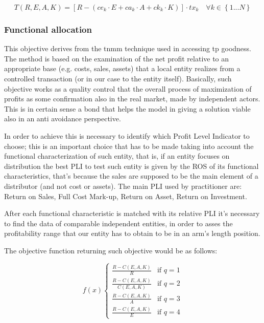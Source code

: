 \begin{doublespace}
\begin{equation}
T(R,E,A,K)= [R-(ce_k\cdot E+ca_k\cdot A+ck_k\cdot K)]\cdot tx_k \quad \forall k \in \left\{1...N\right\}
\end{equation}

\subsubsection{Functional allocation}
This objective derives from the \gls{tnmm} technique used in accessing \gls{tp} goodness. The method is based on the examination of the net profit relative to an appropriate base (e.g. costs, sales, assets) that a local entity realizes from a controlled transaction (or in our case to the entity itself). Basically, such objective works as a quality control that the overall process of maximization of profits as some confirmation also in the real market, made by independent actors. This is in certain sense a bond that helps the model in giving a solution viable also in an anti avoidance perspective.

In order to achieve this is necessary to identify which Profit Level Indicator to choose; this is an important choice that has to be made taking into account the functional characterization of such entity, that is, if an entity focuses on distribution the best PLI to test such entity is given by the ROS of its functional characteristics, that's because the sales are supposed to be the main element of a distributor (and not cost or assets). The main PLI used by practitioner are: Return on Sales, Full Cost Mark-up, Return on Asset, Return on Investment.

After each functional characteristic is matched with its relative PLI it's necessary to find the data of comparable independent entities, in order to asses the profitability range that our entity has to obtain to be in an arm's length position.

The objective function returning such objective would be as follows:

\begin{equation}
f(x) 
\begin{cases}
   \frac{R - C(E,A,K)}{R} & \text{if } q=1
   \\
   \frac{R - C(E,A,K)}{C(E,A,K)} & \text{if } q=2
   \\
   \frac{R - C(E,A,K)}{A} & \text{if } q=3
   \\
   \frac{R - C(E,A,K)}{E} & \text{if } q=4
\end{cases}
\end{equation}


\end{doublespace}
